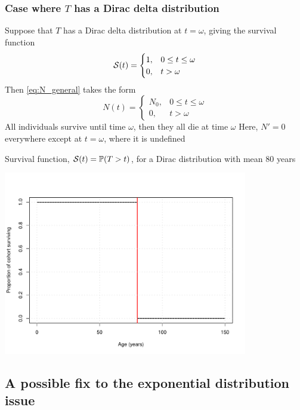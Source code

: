 \documentclass[aspectratio=169]{beamer}\usepackage[]{graphicx}\usepackage[]{xcolor}
\begin{document}
\begin{frame}\frametitle{Case where $T$ has a Dirac delta distribution}
Suppose that $T$ has a Dirac delta distribution at $t=\omega$, giving the
survival function 
\[
\S(t)=\begin{cases}
1, & 0\leq t\leq\omega \\
0, & t>\omega 
\end{cases}
\]
Then \eqref{eq:N_general} takes the form
\begin{equation}\label{eq:N2}
N(t)=\begin{cases}
N_0, & 0\leq t\leq\omega \\
0, & t>\omega
\end{cases}
\end{equation}
All individuals survive until time $\omega$, then they all die at time $\omega$
\vfill
Here, $N'=0$ everywhere except at $t=\omega$, where it is undefined
\end{frame}




\begin{frame}
Survival function, $\S(t)=\IP(T>t)$, for a Dirac distribution with mean 80 years
\begin{center}
\includegraphics[width=0.8\textwidth]{FIGS/L24-prop_surviving_dirac_80years-1.pdf}
\end{center}
\end{frame}




\subsection{A possible fix to the exponential distribution issue} 
\end{document}
